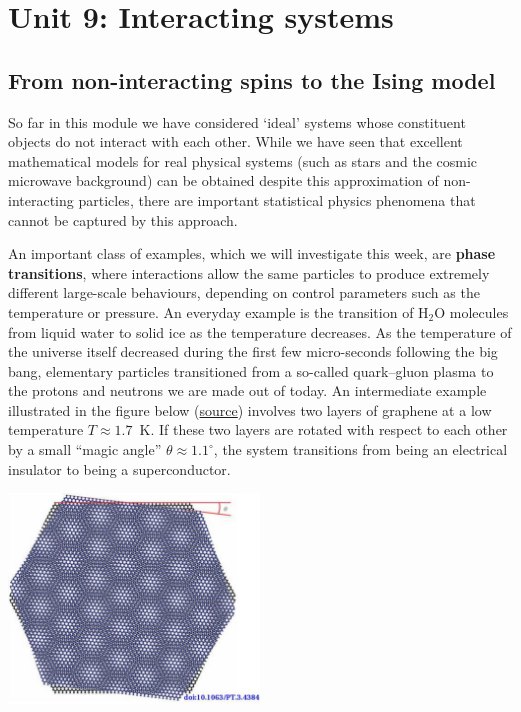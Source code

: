 \renewcommand{\thisunit}{MATH327 Unit 9}
\renewcommand{\moddate}{Last modified 17 Mar.~2022}
\setcounter{section}{9}
\setcounter{subsection}{0}
{}
\section*{Unit 9: Interacting systems}
\subsection{\label{sec:Ising}From non-interacting spins to the Ising model}
So far in this module we have considered `ideal' systems whose constituent objects do not interact with each other.
While we have seen that excellent mathematical models for real physical systems (such as stars and the cosmic microwave background) can be obtained despite this approximation of non-interacting particles, there are important statistical physics phenomena that cannot be captured by this approach.

An important class of examples, which we will investigate this week, are \textbf{phase transitions}, where interactions allow the same particles to produce extremely different large-scale behaviours, depending on control parameters such as the temperature or pressure.
An everyday example is the transition of H$_2$O molecules from liquid water to solid ice as the temperature decreases.
As the temperature of the universe itself decreased during the first few micro-seconds following the big bang, elementary particles transitioned from a so-called quark--gluon plasma to the protons and neutrons we are made out of today.
An intermediate example illustrated in the figure below (\href{https://doi.org/10.1063/PT.3.4384}{source}) involves two layers of graphene at a low temperature $T \approx 1.7$~K.
If these two layers are rotated with respect to each other by a small ``magic angle'' $\theta \approx 1.1^{\circ}$, the system transitions from being an electrical insulator to being a superconductor.

\begin{center}\includegraphics[width=0.5\textwidth]{figs/unit09_graphene.pdf}\end{center}

